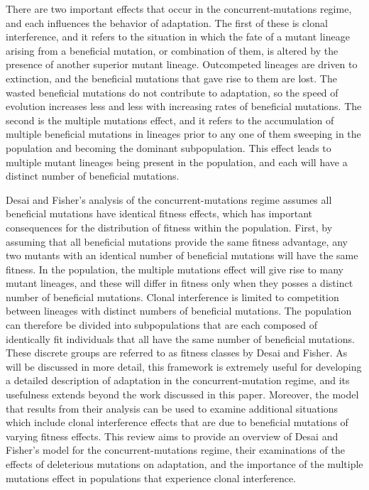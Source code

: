 \documentclass[12pt, one column]{article}
\begin{document}
There are two important effects that occur in the concurrent-mutations regime, and each influences the behavior of adaptation.  The first of these is clonal interference, and it refers to the situation in which the fate of a mutant lineage arising from a beneficial mutation, or combination of them, is altered by the presence of another superior mutant lineage.  Outcompeted lineages are driven to extinction, and the beneficial mutations that gave rise to them are lost.  The wasted beneficial mutations do not contribute to adaptation, so the speed of evolution increases less and less with increasing rates of beneficial mutations.  The second is the multiple mutations effect, and it refers to the accumulation of multiple beneficial mutations in lineages prior to any one of them sweeping in the population and becoming the dominant subpopulation.  This effect leads to multiple mutant lineages being present in the population, and each will have a distinct number of beneficial mutations.    

Desai and Fisher's analysis of the concurrent-mutations regime assumes all beneficial mutations have identical fitness effects, which has important consequences for the distribution of fitness within the population.  First, by assuming that all beneficial mutations provide the same fitness advantage, any two mutants with an identical number of beneficial mutations will have the same fitness.  In the population, the multiple mutations effect will give rise to many mutant lineages, and these will differ in fitness only when they posses a distinct number of beneficial mutations.  Clonal interference is limited to competition between lineages with distinct numbers of beneficial mutations.  The population can therefore be divided into subpopulations that are each composed of identically fit individuals that all have the same number of beneficial mutations.  These discrete groups are referred to as fitness classes by Desai and Fisher.  As will be discussed in more detail, this framework is extremely useful for developing a detailed description of adaptation in the concurrent-mutation regime, and its usefulness extends beyond the work discussed in this paper.  Moreover, the model that results from their analysis can be used to examine additional situations which include clonal interference effects that are due to beneficial mutations of varying fitness effects.  This review aims to provide an overview of Desai and Fisher's model for the concurrent-mutations regime, their examinations of the effects of deleterious mutations on adaptation, and the importance of the multiple mutations effect in populations that experience clonal interference.
\end{document}
